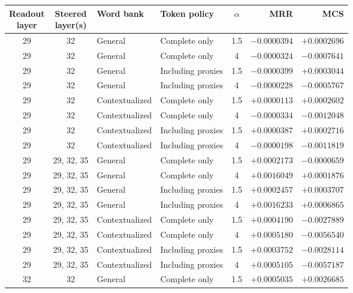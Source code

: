 \begin{table}[p]
\centering
\scriptsize
\setlength{\tabcolsep}{4pt}
\renewcommand{\arraystretch}{0.88}
\begin{tabular*}{\textwidth}{@{\extracolsep{\fill}}ccllcrr@{}}
\toprule
\shortstack{Readout\\layer} & \shortstack{Steered\\layer(s)} & Word bank & Token policy & $\alpha$ & MRR & MCS \\
\midrule
29 & 32 & General & Complete only & 1.5 & $-0.0000394$ & $+0.0002696$ \\
29 & 32 & General & Complete only & 4 & $-0.0000324$ & $-0.0007641$ \\
29 & 32 & General & Including proxies & 1.5 & $-0.0000399$ & $+0.0003044$ \\
29 & 32 & General & Including proxies & 4 & $-0.0000228$ & $-0.0005767$ \\
29 & 32 & Contextualized & Complete only & 1.5 & $+0.0000113$ & $+0.0002602$ \\
29 & 32 & Contextualized & Complete only & 4 & $-0.0000334$ & $-0.0012048$ \\
29 & 32 & Contextualized & Including proxies & 1.5 & $+0.0000387$ & $+0.0002716$ \\
29 & 32 & Contextualized & Including proxies & 4 & $-0.0000198$ & $-0.0011819$ \\
29 & 29, 32, 35 & General & Complete only & 1.5 & $+0.0002173$ & $-0.0000659$ \\
29 & 29, 32, 35 & General & Complete only & 4 & $+0.0016049$ & $+0.0001876$ \\
29 & 29, 32, 35 & General & Including proxies & 1.5 & $+0.0002457$ & $+0.0003707$ \\
29 & 29, 32, 35 & General & Including proxies & 4 & $+0.0016233$ & $+0.0006865$ \\
29 & 29, 32, 35 & Contextualized & Complete only & 1.5 & $+0.0004190$ & $-0.0027889$ \\
29 & 29, 32, 35 & Contextualized & Complete only & 4 & $+0.0005180$ & $-0.0056540$ \\
29 & 29, 32, 35 & Contextualized & Including proxies & 1.5 & $+0.0003752$ & $-0.0028114$ \\
29 & 29, 32, 35 & Contextualized & Including proxies & 4 & $+0.0005105$ & $-0.0057187$ \\
\midrule
32 & 32 & General & Complete only & 1.5 & $+0.0005035$ & $+0.0026685$ \\

\end{tabular*}
\end{table}
